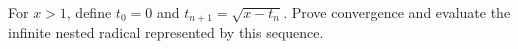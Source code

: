 For $x>1$, define $t_0=0$ and $t_{n+1}=\sqrt{x-t_n}$. Prove convergence and evaluate the infinite nested radical represented by this sequence.
